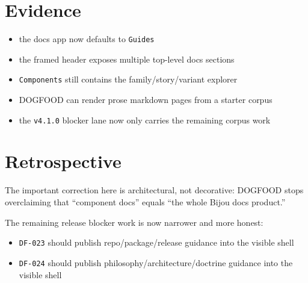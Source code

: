\section{Evidence}\label{record-083-evidence}

\begin{itemize}
\tightlist
\item
  the docs app now defaults to \texttt{G\allowbreak{}u\allowbreak{}i\allowbreak{}d\allowbreak{}e\allowbreak{}s}
\item
  the framed header exposes multiple top-level docs sections
\item
  \texttt{C\allowbreak{}o\allowbreak{}m\allowbreak{}p\allowbreak{}o\allowbreak{}n\allowbreak{}e\allowbreak{}n\allowbreak{}t\allowbreak{}s} still contains the family/story/variant explorer
\item
  DOGFOOD can render prose markdown pages from a starter corpus
\item
  the \texttt{v\allowbreak{}4\allowbreak{}.\allowbreak{}1\allowbreak{}.\allowbreak{}0} blocker lane now only carries the remaining corpus work
\end{itemize}

\section{Retrospective}\label{record-083-retrospective}

The important correction here is architectural, not decorative: DOGFOOD stops overclaiming that ``component docs'' equals ``the whole Bijou docs product.''

The remaining release blocker work is now narrower and more honest:

\begin{itemize}
\tightlist
\item
  \texttt{D\allowbreak{}F\allowbreak{}-\allowbreak{}0\allowbreak{}2\allowbreak{}3} should publish repo/package/release guidance into the visible shell
\item
  \texttt{D\allowbreak{}F\allowbreak{}-\allowbreak{}0\allowbreak{}2\allowbreak{}4} should publish philosophy/architecture/doctrine guidance into the visible shell
\end{itemize}

